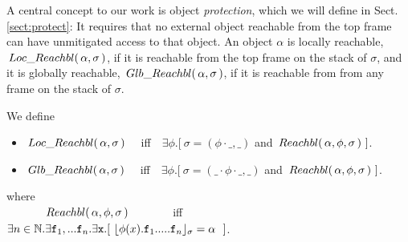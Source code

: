 { {A central concept to our work is object \emph{protection}, which we will define in   Sect. \ref{sect:protect}: It requires that no external object  
reachable from the top frame  can have unmitigated access to that object.}
%
%
An object $\alpha$ is  locally reachable, $ \,Loc\_Reachbl(\,\alpha,\sigma\,) $, if it is reachable from the top frame on the stack of $\sigma$,
and it is globally reachable, $\,Glb\_Reachbl(\,\alpha,\sigma\,)$, if it is reachable from from any  frame on the stack of $\sigma$.
 
\begin{definition} We define 
\begin{itemize}
\item
$ \,Loc\_Reachbl(\,\alpha,\sigma\,) $ \ \ iff\ \  
$\exists \phi.[\ \sigma=(\phi\cdot\_, \_)$ and $\Relevant \alpha \phi \sigma\ ]$. %
\item
$\,Glb\_Reachbl(\,\alpha,\sigma\,)$  \ \ iff\ \  
$\exists \phi.[\ \sigma=(\_\cdot\phi\cdot\_, \_)$ and $\Relevant \alpha \phi \sigma\ ]$. %
\end{itemize}
where\\
$\strut\ \ \ \  \ \ \ \ \ \ \,Reachbl(\,\alpha,\phi,\sigma\,) $  \ \ \ \ \ \ \ iff\ \  
$\exists n\in \mathbb{N}.\exists \prg{f}_1,... \prg{f}_n.\exists \prg{x}.[ \ \interpret{\sigma}{\phi(x).\prg{f}_1.....\prg{f}_n} = \alpha \ \ ]$.

\end{definition}

}

